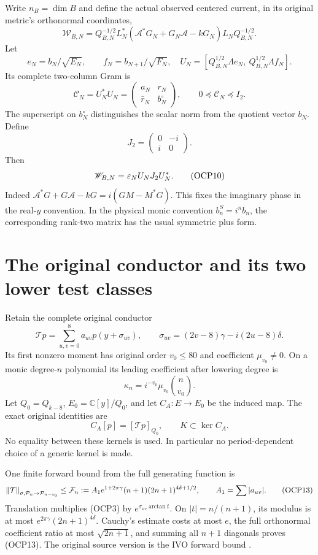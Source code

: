 \documentclass[10pt]{article}
\newcommand{\C}{\mathbb C}\newcommand{\Pp}{\mathcal P}
\begin{document}
Write $n_B=\dim B$ and define the actual observed centered current, in its original metric's orthonormal coordinates,
\[
 \mathscr W_{B,N}=Q_{B,N}^{-1/2}L_N^*
 (\mathscr A^*G_N+G_N\mathscr A-kG_N)
 L_NQ_{B,N}^{-1/2}.
 \tag{OCP8}
\]
Let
\[
 e_N=b_N/\sqrt{E_N},\qquad f_N=b_{N+1}/\sqrt{F_N},
 \quad U_N=[Q_{B,N}^{1/2}\Lambda e_N,\ Q_{B,N}^{1/2}\Lambda f_N].
\]
Its complete two-column Gram is
\[
 \mathcal C_N=U_N^*U_N=
 \begin{pmatrix}a_N&r_N\\\bar r_N&b_N^{\circ}\end{pmatrix},
 \qquad 0\preceq\mathcal C_N\preceq I_2.
 \tag{OCP9}
\]
The superscript on $b_N^{\circ}$ distinguishes the scalar norm from the quotient vector $b_N$. Define
\[
 J_2=\begin{pmatrix}0&-i\\i&0\end{pmatrix}.
\]
Then
\[
 \mathscr W_{B,N}=\varepsilon_NU_NJ_2U_N^*.
 \tag{OCP10}
\]
Indeed $\mathscr A^*G+G\mathscr A-kG=i(GM-M^*G)$. This fixes the imaginary phase in the real-$y$ convention. In the physical monic convention $b_n^S=i^nb_n$, the corresponding rank-two matrix has the usual symmetric plus form.

\section{The original conductor and its two lower test classes}
Retain the complete original conductor
\[
 \mathcal Tp=\sum_{u,v=0}^8a_{uv}p(y+\sigma_{uv}),\qquad
 \sigma_{uv}=(2v-8)\gamma-i(2u-8)\delta.
\]
Its first nonzero moment has original order $v_0\le80$ and coefficient $\mu_{v_0}\ne0$. On a monic degree-$n$ polynomial its leading coefficient after lowering degree is
\[
 \kappa_n=i^{-v_0}\mu_{v_0}\binom n{v_0}.
 \tag{OCP11}
\]
Let $Q_0=Q_{k-8}$, $E_0=\C[y]/Q_0$, and let $C_A:E\to E_0$ be the induced map. The exact original identities are
\[
 C_A[p]=[\mathcal Tp]_{Q_0},\qquad K\subset\ker C_A.
 \tag{OCP12}
\]
No equality between these kernels is used. In particular no period-dependent choice of a generic kernel is made.

One finite forward bound from the full generating function is
\[
 \norm{\mathcal T}_{\sigma,\Pp_n\to\Pp_{n-v_0}}
 \le\mathcal F_n:=A_1e^{1+2\pi\gamma}(n+1)(2n+1)^{4\delta+1/2},
 \qquad A_1=\sum|a_{uv}|.
 \tag{OCP13}
\]
Translation multiplies (OCP3) by $e^{\sigma_{uv}\arctan t}$. On $|t|=n/(n+1)$, its modulus is at most $e^{2\pi\gamma}(2n+1)^{4\delta}$. Cauchy's estimate costs at most $e$, the full orthonormal coefficient ratio at most $\sqrt{2n+1}$, and summing all $n+1$ diagonals proves (OCP13). The original source version is the IVO forward bound \cite{ivo}.
\end{document}
